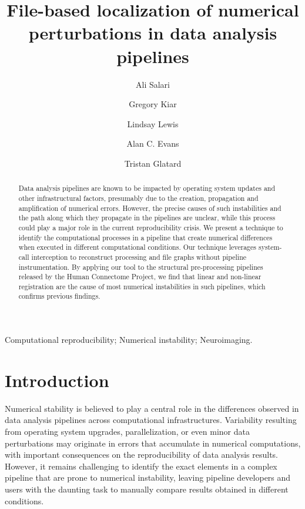 \documentclass[a4paper,num-refs]{oup-contemporary}
\title{File-based localization of numerical perturbations in data analysis pipelines}
\begin{document}
\author[1]{Ali Salari}
\author[2,3]{Gregory Kiar}
\author[2]{Lindsay Lewis}
\author[2,3]{Alan C. Evans}
\author[1]{Tristan Glatard}


\maketitle

\begin{abstract} 

Data analysis pipelines are known to be impacted by operating system
updates and other infrastructural factors, presumably due to the creation,
propagation and amplification of numerical errors. However, the precise
causes of such instabilities and the path along which they propagate in the
pipelines are unclear, while this process could play a major role in the
current reproducibility crisis. We present a technique to identify the
computational processes in a pipeline that create numerical differences
when executed in different computational conditions. Our technique
leverages system-call interception to reconstruct processing and file
graphs without pipeline instrumentation. By applying our tool to the
structural pre-processing pipelines released by the Human Connectome
Project, we find that linear and non-linear registration are the cause of
most numerical instabilities in such pipelines, which confirms previous
findings. 

\end{abstract}

\begin{keywords}
Computational reproducibility; Numerical instability; Neuroimaging.
\end{keywords}


\section{Introduction}


Numerical stability is believed to play a central role in the differences
observed in data analysis pipelines across computational infrastructures.
Variability resulting from operating system upgrades, parallelization, or
even minor data perturbations may originate in errors that accumulate in
numerical computations, with important consequences on the reproducibility
of data analysis results. However, it remains challenging to identify the
exact elements in a complex pipeline that are prone to numerical instability,
leaving pipeline developers and users with the daunting task to manually
compare results obtained in different conditions. 
\end{document}
